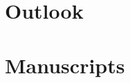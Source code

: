 \cleardoublepage %




\part{Outlook}\label{part:outlook}



 
\appendix


\cleardoublepage %
\cleardoublepage %

\cleardoublepage

\part{Manuscripts}\label{part:manuscripts}





\cleardoublepage %





